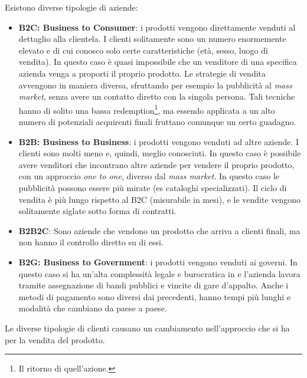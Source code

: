 Esistono diverse tipologie di aziende:
\begin{itemize}
  \item \textbf{B2C: Business to Consumer}: i prodotti vengono direttamente
  venduti al dettaglio alla clientela. I clienti solitamente sono un numero
  enormemente elevato e di cui conosco solo certe caratteristiche (età, sesso,
  luogo di vendita). In questo caso è quasi impossibile che un venditore di una
  specifica azienda venga a proporti il proprio prodotto. Le strategie di
  vendita avvengono in maniera diversa, sfruttando per esempio la pubblicità al
  \textit{mass market}, senza avere un contatto diretto con la singola persona.
  Tali tecniche hanno di solito una bassa redemption\footnote{Il ritorno di
  quell'azione.}, ma essendo applicata a un alto numero di potenziali
  acquirenti finali fruttano comunque un certo guadagno.

  \item \textbf{B2B: Business to Business}: i prodotti vengono venduti ad altre
  aziende. I clienti sono molti meno e, quindi, meglio conosciuti. In questo
  caso è possibile avere venditori che incontrano altre aziende per vendere il
  proprio prodotto, con un approccio \textit{one to one}, diverso dal
  \textit{mass market}. In questo caso le pubblicità possono essere più mirate
  (es cataloghi specializzati). Il ciclo di vendita è più lungo rispetto al B2C
  (misurabile in mesi), e le vendite vengono solitamente siglate sotto forma di
  contratti. 

  \item \textbf{B2B2C}: Sono aziende che vendono un prodotto che arriva a
  clienti finali, ma non hanno il controllo diretto su di essi.

  \item \textbf{B2G: Business to Government}: i prodotti vengono venduti ai
  governi. In questo caso si ha un'alta complessità legale e burocratica in e
  l'azienda lavora tramite assegnazione di bandi pubblici e vincite di gare
  d'appalto. Anche i metodi di pagamento sono diversi dai precedenti, hanno
  tempi più lunghi e modalità che cambiano da paese a paese.
\end{itemize}

Le diverse tipologie di clienti causano un cambiamento nell'approccio che si ha
per la vendita del prodotto.
